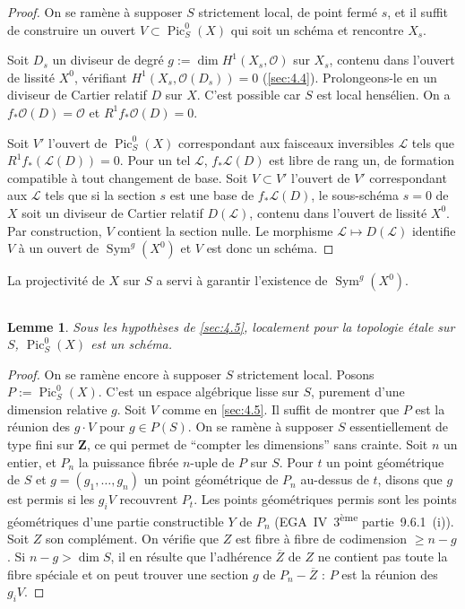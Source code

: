 \documentclass[12pt,a4paper]{article}
\theoremstyle{plain}
\newtheorem{lemma}[theorem]{Lemme}
\theoremstyle{definition}
\theoremstyle{remark}
\DeclareMathOperator{\Pic}{Pic}
\DeclareMathOperator{\Sym}{Sym}
\newcommand{\cO}{\mathcal{O}}
\begin{document}
\begin{proof}
On se ramène à supposer $S$ strictement local, de point fermé $s$, et il suffit de construire un ouvert $V \subset \Pic_S^0(X)$ qui soit un schéma et rencontre $X_s$.

Soit $D_s$ un diviseur de degré $g := \dim H^1(X_s, \cO)$ sur $X_s$, contenu dans l'ouvert de lissité $X^0$, vérifiant $H^1(X_s, \cO(D_s)) = 0$ (\ref{sec:4.4}). Prolongeons-le en un diviseur de Cartier relatif $D$ sur $X$. C'est possible car $S$ est local hensélien. On a $f_* \cO(D) = \cO$ et $R^1 f_* \cO(D) = 0$.

Soit $V'$ l'ouvert de $\Pic_S^0(X)$ correspondant aux faisceaux inversibles $\mathcal{L}$ tels que $R^1 f_* (\mathcal{L}(D)) = 0$. Pour un tel $\mathcal{L}$, $f_* \mathcal{L}(D)$ est libre de rang un, de formation compatible à tout changement de base. Soit $V \subset V'$ l'ouvert de $V'$ correspondant aux $\mathcal{L}$ tels que si la section $s$ est une base de $f_* \mathcal{L}(D)$, le sous-schéma $s = 0$ de $X$ soit un diviseur de Cartier relatif $D(\mathcal{L})$, contenu dans l'ouvert de lissité $X^0$. Par construction, $V$ contient la section nulle. Le morphisme $\mathcal{L} \mapsto D(\mathcal{L})$ identifie $V$ à un ouvert de $\Sym^g(X^0)$ et $V$ est donc un schéma.
\end{proof}

La projectivité de $X$ sur $S$ a servi à garantir l'existence de $\Sym^g(X^0)$.

\subsection{}\label{sec:4.6}

\begin{lemma}
Sous les hypothèses de \ref{sec:4.5}, localement pour la topologie étale sur $S$, $\Pic_S^0(X)$ est un schéma.
\end{lemma}

\begin{proof}
On se ramène encore à supposer $S$ strictement local. Posons $P := \Pic_S^0(X)$. C'est un espace algébrique lisse sur $S$, purement d'une dimension relative $g$. Soit $V$ comme en \ref{sec:4.5}. Il suffit de montrer que $P$ est la réunion des $g \cdot V$ pour $g \in P(S)$. On se ramène à supposer $S$ essentiellement de type fini sur $\mathbf{Z}$, ce qui permet de ``compter les dimensions'' sans crainte. Soit $n$ un entier, et $P_n$ la puissance fibrée $n$-uple de $P$ sur $S$. Pour $t$ un point géométrique de $S$ et $g = (g_1, \ldots, g_n)$ un point géométrique de $P_n$ au-dessus de $t$, disons que $g$ est permis si les $g_i V$ recouvrent $P_t$. Les points géométriques permis sont les points géométriques d'une partie constructible $Y$ de $P_n$ (EGA~IV~3\textsuperscript{ème} partie~9.6.1~(i)). Soit $Z$ son complément. On vérifie que $Z$ est fibre à fibre de codimension $\geq n - g$. Si $n - g > \dim S$, il en résulte que l'adhérence $\overline{Z}$ de $Z$ ne contient pas toute la fibre spéciale et on peut trouver une section $g$ de $P_n - \overline{Z}$ : $P$ est la réunion des $g_i V$.
\end{proof}
\end{document}
